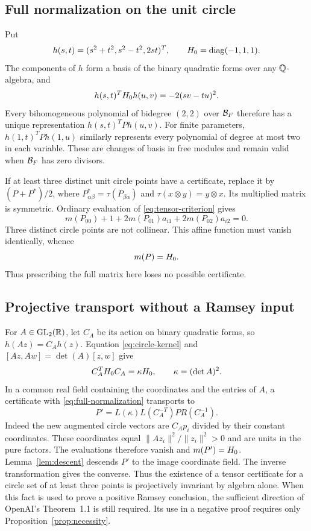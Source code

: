 \subsection{Full normalization on the unit circle}
Put
\[
 h(s,t)=(s^2+t^2,s^2-t^2,2st)^T,\qquad
 H_0=\operatorname{diag}(-1,1,1).
\]
The components of $h$ form a basis of the binary quadratic forms over
any $\mathbb Q$-algebra, and
\begin{equation}\label{eq:circle-kernel}
 h(s,t)^TH_0 h(u,v)=-2(sv-tu)^2.
\end{equation}
Every bihomogeneous polynomial of bidegree $(2,2)$ over $\mathcal B_F$
therefore has a unique representation $h(s,t)^TPh(u,v)$.
For finite parameters, $h(1,t)^TPh(1,u)$ similarly represents every
polynomial of degree at most two in each variable. These are changes
of basis in free modules and remain valid when $\mathcal B_F$ has zero divisors.

If at least three distinct unit circle points have a certificate,
replace it by $(P+P^*)/2$, where
$P^*_{\alpha\beta}=\tau(P_{\beta\alpha})$ and
$\tau(x\otimes y)=y\otimes x$. Its multiplied matrix is symmetric.
Ordinary evaluation of \eqref{eq:tensor-criterion} gives
\[
 m(P_{00})+1+2m(P_{01})a_{i1}+2m(P_{02})a_{i2}=0.
\]
Three distinct circle points are not collinear. This affine function
must vanish identically, whence
\begin{equation}\label{eq:full-normalization}
 m(P)=H_0.
\end{equation}
Thus prescribing the full matrix here loses no possible certificate.

\subsection{Projective transport without a Ramsey input}\label{sec:transport}
For $A\in\mathrm{GL}_2(\mathbb R)$, let $C_A$ be its action on binary
quadratic forms, so $h(Az)=C_Ah(z)$. Equation
\eqref{eq:circle-kernel} and $[Az,Aw]=\det(A)[z,w]$ give
\[
 C_A^TH_0 C_A=\kappa H_0,\qquad \kappa=(\det A)^2.
\]
In a common real field containing the coordinates and the entries of
$A$, a certificate with \eqref{eq:full-normalization} transports to
\begin{equation}\label{eq:transport}
 P'=L(\kappa)L(C_A^{-T})PR(C_A^{-1}).
\end{equation}
Indeed the new augmented circle vectors are $C_Ap_i$ divided by their
constant coordinates. These coordinates equal
$\|Az_i\|^2/\|z_i\|^2>0$ and are units in the pure factors.
The evaluations therefore vanish and $m(P')=H_0$.
Lemma~\ref{lem:descent} descends $P'$ to the image coordinate field.
The inverse transformation gives the converse. Thus the existence of
a tensor certificate for a circle set of at least three points is
projectively invariant by algebra alone. When this fact is used to
prove a positive Ramsey conclusion, the sufficient direction of
OpenAI's Theorem~1.1 is still required. Its use in a negative proof
requires only Proposition~\ref{prop:necessity}.
